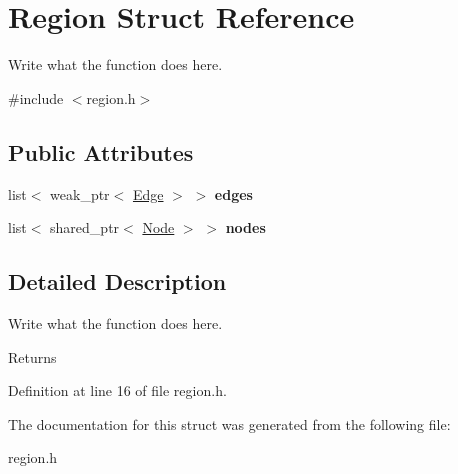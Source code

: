 \hypertarget{structRegion}{\section{Region Struct Reference}
\label{structRegion}
}


Write what the function does here.  




{\ttfamily \#include $<$region.\+h$>$}

\subsection*{Public Attributes}
\begin{DoxyCompactItemize}
\item 
\hypertarget{structRegion_a98be146388a90c0c42ab2d8ba2dd1804}{list$<$ weak\+\_\+ptr$<$ \hyperlink{structEdge}{Edge} $>$ $>$ {\bfseries edges}}\label{structRegion_a98be146388a90c0c42ab2d8ba2dd1804}

\item 
\hypertarget{structRegion_a8a56abfa456673273c9f9f8138c68bdf}{list$<$ shared\+\_\+ptr$<$ \hyperlink{classNode}{Node} $>$ $>$ {\bfseries nodes}}\label{structRegion_a8a56abfa456673273c9f9f8138c68bdf}

\end{DoxyCompactItemize}


\subsection{Detailed Description}
Write what the function does here. 

\begin{DoxyReturn}{Returns}

\end{DoxyReturn}


Definition at line 16 of file region.\+h.



The documentation for this struct was generated from the following file\+:\begin{DoxyCompactItemize}
\item 
region.\+h\end{DoxyCompactItemize}
